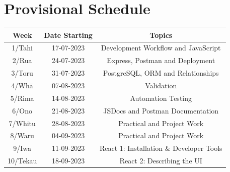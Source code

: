 \documentclass{article}
\begin{document}
\section*{Provisional Schedule}
\renewcommand{\arraystretch}{1.5}
\begin{tabular}{|c|c|c|c|}
	\hline
	\textbf{Week}                  & \textbf{Date Starting}            & \multicolumn{2}{c|}{\textbf{Topics}}                                                                                             \\ \hline
	\footnotesize 1/Tahi           & \footnotesize 17-07-2023 & \multicolumn{2}{c|}{\footnotesize Development Workflow and JavaScript}    \\ \hline
	\footnotesize 2/Rua            & \footnotesize 24-07-2023 & \multicolumn{2}{c|}{\footnotesize Express, Postman and Deployment}                   \\ \hline
	\footnotesize 3/Toru           & \footnotesize 31-07-2023 & \multicolumn{2}{c|}{\footnotesize PostgreSQL, ORM and Relationships} \\ \hline
	\footnotesize 4/Whā            & \footnotesize 07-08-2023 & \multicolumn{2}{c|}{\footnotesize Validation}                               \\ \hline
	\footnotesize 5/Rima           & \footnotesize 14-08-2023 & \multicolumn{2}{c|}{\footnotesize Automation Testing}                                                \\ \hline
	\footnotesize 6/Ono            & \footnotesize 21-08-2023  & \multicolumn{2}{c|}{\footnotesize JSDocs and Postman Documentation}                                                   \\ \hline
	\footnotesize 7/Whitu          & \footnotesize 28-08-2023 &  \multicolumn{2}{c|}{\footnotesize Practical and Project Work}                            \\ \hline
	\footnotesize 8/Waru   & \footnotesize 04-09-2023 & \multicolumn{2}{c|}{\footnotesize Practical and Project Work}                                                   \\ \hline
	\footnotesize 9/Iwa            & \footnotesize 11-09-2023 & \multicolumn{2}{c|}{\footnotesize React 1: Installation \& Developer Tools}                                                                 \\ \hline
	\footnotesize 10/Tekau         & \footnotesize 18-09-2023 & \multicolumn{2}{c|}{\footnotesize React 2: Describing the UI}                                                                 \\ \hline

\end{tabular}
\end{document}
